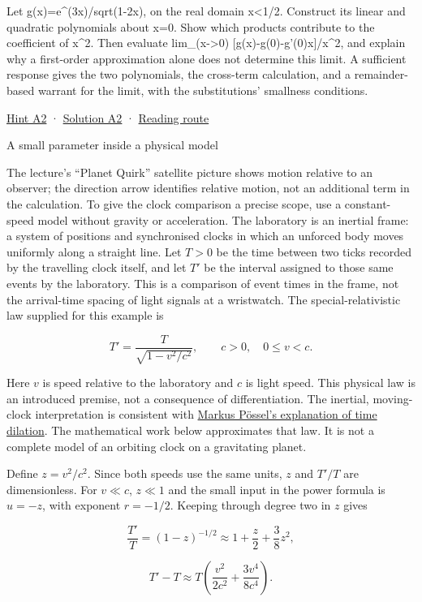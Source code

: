 \documentclass[
  11pt,
]{article}
\providecommand{\gt}{>}
\begin{document}
Let g(x)=e\^{}(3x)/sqrt(1-2x), on the real domain x\textless1/2.
Construct its linear and quadratic polynomials about x=0. Show which
products contribute to the coefficient of x\^{}2. Then evaluate
lim\_(x-\textgreater0) {[}g(x)-g(0)-g'(0)x{]}/x\^{}2, and explain why a
first-order approximation alone does not determine this limit. A
sufficient response gives the two polynomials, the cross-term
calculation, and a remainder-based warrant for the limit, with the
substitutions' smallness conditions.

\protect\hyperlink{h2}{Hint A2} · \protect\hyperlink{s2}{Solution A2} ·
\protect\hyperlink{route}{Reading route}

A small parameter inside a physical model

The lecture's ``Planet Quirk'' satellite picture shows motion relative
to an observer; the direction arrow identifies relative motion, not an
additional term in the calculation. To give the clock comparison a
precise scope, use a constant-speed model without gravity or
acceleration. The laboratory is an inertial frame: a system of positions
and synchronised clocks in which an unforced body moves uniformly along
a straight line. Let \(T\gt 0\) be the time between two ticks recorded
by the travelling clock itself, and let \(T'\) be the interval assigned
to those same events by the laboratory. This is a comparison of event
times in the frame, not the arrival-time spacing of light signals at a
wristwatch. The special-relativistic law supplied for this example is

\[T'=\frac{T}{\sqrt{1-v^2/c^2}},\qquad c>0,\quad0\le v<c.\]

Here \(v\) is speed relative to the laboratory and \(c\) is light speed.
This physical law is an introduced premise, not a consequence of
differentiation. The inertial, moving-clock interpretation is consistent
with
\href{https://www.einstein-online.info/en/spotlight/light-clocks-time-dilation/}{Markus
Pössel's explanation of time dilation}. The mathematical work below
approximates that law. It is not a complete model of an orbiting clock
on a gravitating planet.

Define \(z=v^2/c^2\). Since both speeds use the same units, \(z\) and
\(T'/T\) are dimensionless. For \(v\ll c\), \(z\ll1\) and the small
input in the power formula is \(u=-z\), with exponent \(r=-1/2\).
Keeping through degree two in \(z\) gives

\[\frac{T'}T=(1-z)^{-1/2}\approx1+\frac z2+\frac38z^2,\]

\[T'-T\approx T\left(\frac{v^2}{2c^2}+\frac{3v^4}{8c^4}\right).\]
\end{document}
